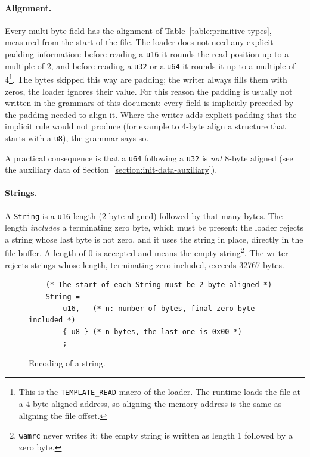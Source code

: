 \documentclass{article}
\begin{document}
\paragraph{Alignment.}
Every multi-byte field has the alignment of Table~\ref{table:primitive-types}, measured from the start of the file.
The loader does not need any explicit padding information: before reading a \verb|u16| it rounds the read position up to a multiple of 2, and before reading a \verb|u32| or a \verb|u64| it rounds it up to a multiple of 4\footnote{This is the \texttt{TEMPLATE\_READ} macro of the loader. The runtime loads the file at a 4-byte aligned address, so aligning the memory address is the same as aligning the file offset.}.
The bytes skipped this way are padding; the writer always fills them with zeros, the loader ignores their value.
For this reason the padding is usually not written in the grammars of this document: every field is implicitly preceded by the padding needed to align it.
Where the writer adds explicit padding that the implicit rule would not produce (for example to 4-byte align a structure that starts with a \verb|u8|), the grammar says so.

A practical consequence is that a \verb|u64| following a \verb|u32| is \emph{not} 8-byte aligned (see the auxiliary data of Section~\ref{section:init-data-auxiliary}).

\paragraph{Strings.}
A \verb|String| is a \verb|u16| length (2-byte aligned) followed by that many bytes.
The length \emph{includes} a terminating zero byte, which must be present: the loader rejects a string whose last byte is not zero, and it uses the string in place, directly in the file buffer.
A length of 0 is accepted and means the empty string\footnote{\texttt{wamrc} never writes it: the empty string is written as length 1 followed by a zero byte.}.
The writer rejects strings whose length, terminating zero included, exceeds 32767 bytes.

\begin{figure}[H]
\begin{verbatim}
    (* The start of each String must be 2-byte aligned *)
    String =
        u16,   (* n: number of bytes, final zero byte included *)
        { u8 } (* n bytes, the last one is 0x00 *)
        ;
\end{verbatim}
\caption{Encoding of a string.}
\label{fig:string-grammar}
\end{figure}
\end{document}
